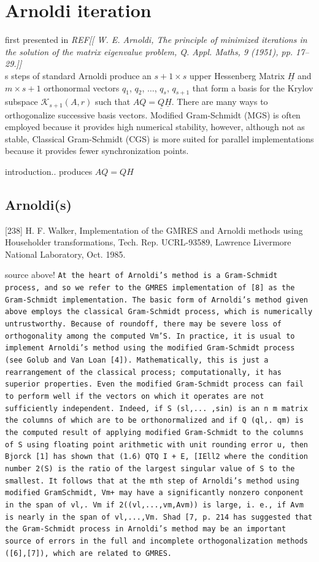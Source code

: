 \documentclass{scrartcl}
\begin{document}
\section{Arnoldi iteration}

first presented in \textit{REF[[ W. E. Arnoldi, The principle of minimized iterations in the solution of the matrix eigenvalue problem, Q. Appl. Maths, 9 (1951), pp. 17–29.]]}\\

s steps of standard Arnoldi produce an $s + 1 \times s$ upper Hessenberg Matrix $\underline{H}$ and $m \times s + 1$ orthonormal vectors $q_1$, $q_2$, $\ldots$, $q_s$, $q_{s + 1}$ that form a basis for the Krylov subspace $\mathcal{K}_{s + 1}\left(A,r\right)$ such that $AQ = \underline{Q} \underline{H}$. There are many ways to orthogonalize successive basis vectors. Modified Gram-Schmidt (MGS) is often employed because it provides high numerical stability, however, although not as stable, Classical Gram-Schmidt (CGS) is more suited for parallel implementations because it provides fewer synchronization points.

introduction.. produces $AQ = QH$
\subsection{Arnoldi(s)}

[238] H. F. Walker, Implementation of the GMRES and Arnoldi methods using Householder transformations, Tech. Rep. UCRL-93589, Lawrence Livermore National Laboratory, Oct. 1985.

source above! \texttt{At the heart of Arnoldi’s method is a Gram-Schmidt process, and so we refer to the
GMRES implementation of [8] as the Gram-Schmidt implementation. The basic form
of Arnoldi’s method given above employs the classical Gram-Schmidt process, which
is numerically untrustworthy. Because of roundoff, there may be severe loss of orthogonality among the computed Vm’S. In practice, it is usual to implement Arnoldi’s
method using the modified Gram-Schmidt process (see Golub and Van Loan [4]).
Mathematically, this is just a rearrangement of the classical process; computationally,
it has superior properties.
Even the modified Gram-Schmidt process can fail to perform well if the vectors on
which it operates are not sufficiently independent. Indeed, if S (sl,... ,sin) is an
n m matrix the columns of which are to be orthonormalized and if Q (ql,. qm)
is the computed result of applying modified Gram-Schmidt to the columns of S using
floating point arithmetic with unit rounding error u, then Bjorck [1] has shown that
(1.6) QTQ I + E, [IEll2
where the condition number 2(S) is the ratio of the largest singular value of S to the
smallest. It follows that at the mth step of Arnoldi’s method using modified GramSchmidt, Vm+ may have a significantly nonzero conponent in the span of {vl,. Vm}
if 2((vl,...,vm,Avm)) is large, i. e., if Avm is nearly in the span of {vl,...,Vm}.
Shad [7, p. 214 has suggested that the Gram-Schmidt process in Arnoldi’s method
may be an important source of errors in the full and incomplete orthogonalization
methods ([6],[7]), which are related to GMRES.
}
\end{document}
